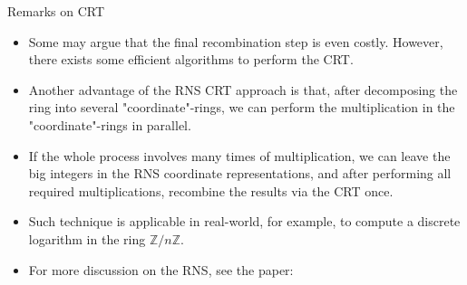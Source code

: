 \begin{frame}{Remarks on CRT}
    \begin{itemize}
        \item Some may argue that the final recombination step is even costly. 
              However, there exists some efficient algorithms to perform the CRT. 
        \item Another advantage of the RNS CRT approach is that, after decomposing 
              the ring into several "coordinate"-rings, we can perform the 
              multiplication in the "coordinate"-rings in parallel. 
        \item If the whole process involves many times of multiplication, 
              we can leave the big integers in the RNS coordinate representations, 
              and after performing all required multiplications, 
              recombine the results via the CRT once.
        \item Such technique is applicable in real-world, for example, 
              to compute a discrete logarithm in the ring \(\mathbb{Z}/ n\mathbb{Z}\).
        \item For more discussion on the RNS, see the paper: 

    \end{itemize}
\end{frame}





